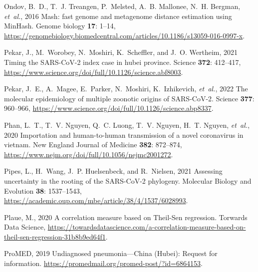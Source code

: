 \documentclass[9pt,twocolumn,twoside]{gsajnl_modified}
\begin{document}
{\begin{thebibliography}{44}
{Ondov, B.~D., T.~J. Treangen, P.~Melsted, A.~B. Mallonee, N.~H. Bergman, {\em
  et~al.\/}}, 2016 Mash: fast genome and metagenome distance estimation using
  {MinHash}. Genome biology {\bf 17}: 1--14,
  \url{https://genomebiology.biomedcentral.com/articles/10.1186/s13059-016-0997-x}.

{Pekar, J., M.~Worobey, N.~Moshiri, K.~Scheffler, {\rm and} J.~O. Wertheim},
  2021 Timing the {SARS-CoV-2} index case in hubei province. Science {\bf 372}:
  412--417, \url{https://www.science.org/doi/full/10.1126/science.abf8003}.

{Pekar, J.~E., A.~Magee, E.~Parker, N.~Moshiri, K.~Izhikevich, {\em et~al.\/}},
  2022 The molecular epidemiology of multiple zoonotic origins of {SARS-CoV-2}.
  Science {\bf 377}: 960--966,
  \url{https://www.science.org/doi/full/10.1126/science.abp8337}.

{Phan, L.~T., T.~V. Nguyen, Q.~C. Luong, T.~V. Nguyen, H.~T. Nguyen, {\em
  et~al.\/}}, 2020 Importation and human-to-human transmission of a novel
  coronavirus in vietnam. New England Journal of Medicine {\bf 382}: 872--874,
  \url{https://www.nejm.org/doi/full/10.1056/nejmc2001272}.

{Pipes, L., H.~Wang, J.~P. Huelsenbeck, {\rm and} R.~Nielsen}, 2021 Assessing
  uncertainty in the rooting of the {SARS-CoV-2} phylogeny. Molecular Biology
  and Evolution {\bf 38}: 1537--1543,
  \url{https://academic.oup.com/mbe/article/38/4/1537/6028993}.

{Plaue, M.}, 2020 {A correlation measure based on Theil-Sen regression}.
  Torwards Data Science,
  \url{https://towardsdatascience.com/a-correlation-measure-based-on-theil-sen-regression-31b8b9ed64f1}.

{ProMED}, 2019 Undiagnosed pneumonia---{China (Hubei)}: Request for
  information. \url{https://promedmail.org/promed-post/?id=6864153}.


\end{thebibliography}}
\end{document}
